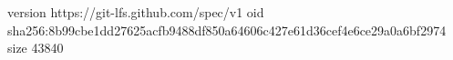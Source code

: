 version https://git-lfs.github.com/spec/v1
oid sha256:8b99cbe1dd27625acfb9488df850a64606c427e61d36cef4e6ce29a0a6bf2974
size 43840
